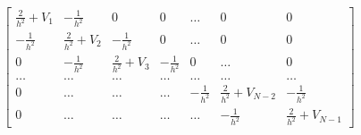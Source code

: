 \documentclass[10pt,showpacs,preprintnumbers,footinbib,amsmath,amssymb,aps,prl,twocolumn,groupedaddress,superscriptaddress,showkeys]{revtex4-1}
\begin{document}
\begin{equation}
    \begin{bmatrix} \frac{2}{h^2}+V_1 & -\frac{1}{h^2} & 0   & 0    & \dots  &0     & 0 \\
                                -\frac{1}{h^2} & \frac{2}{h^2}+V_2 & -\frac{1}{h^2} & 0    & \dots  &0     &0 \\
                                0   & -\frac{1}{h^2} & \frac{2}{h^2}+V_3 & -\frac{1}{h^2}  &0       &\dots & 0\\
                                \dots  & \dots & \dots & \dots  &\dots      &\dots & \dots\\
                                0   & \dots & \dots & \dots  &-\frac{1}{h^2}  &\frac{2}{h^2}+V_{N-2} & -\frac{1}{h^2}\\
                                0   & \dots & \dots & \dots  &\dots       &-\frac{1}{h^2} & \frac{2}{h^2}+V_{N-1}
             \end{bmatrix}
\label{eq:matrixse} 
\end{equation}
\end{document}
